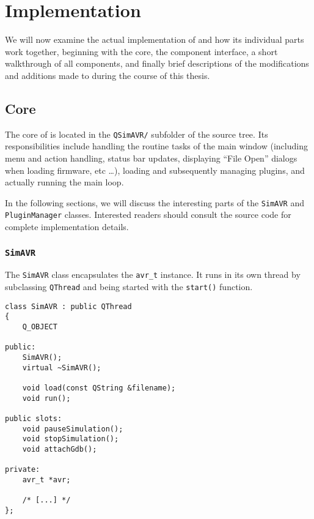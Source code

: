 
\chapter{Implementation} \label{chapter:implementation}

We will now examine the actual implementation of \qsimavr and how its individual
parts work together, beginning with the core, the component interface,
a short walkthrough of all components, and finally brief descriptions of the
modifications and additions made to \simavr during the course of this thesis.

\section{\qsimavr Core} \label{section:core}

The core of \qsimavr is located in the \verb|QSimAVR/| subfolder of the source
tree. Its responsibilities include handling the routine tasks of the main window
(including menu and action handling, status bar updates, displaying ``File Open''
dialogs when loading firmware, etc \ldots), loading and subsequently managing
plugins, and actually running the \simavr main loop.

In the following sections, we will discuss the interesting parts of the
\lstinline|SimAVR| and \lstinline|PluginManager| classes. Interested readers
should consult the source code for complete implementation details.

\subsection{\lstinline|SimAVR|} \label{subsection:class_simavr}

The \lstinline|SimAVR| class encapsulates the \lstinline|avr_t| instance. It
runs in its own thread by subclassing \lstinline|QThread| and being started
with the \lstinline|start()| function.

\begin{lstlisting}
class SimAVR : public QThread
{
    Q_OBJECT

public:
    SimAVR();
    virtual ~SimAVR();

    void load(const QString &filename);
    void run();

public slots:
    void pauseSimulation();
    void stopSimulation();
    void attachGdb();

private:
    avr_t *avr;

    /* [...] */
};
\end{lstlisting}

